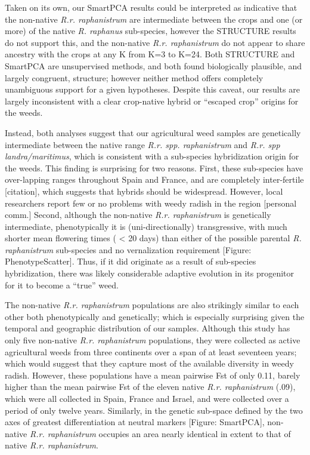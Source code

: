 \documentclass[twocolumn]{bmcart}%
\begin{document}
Taken on its own, our SmartPCA results could be interpreted as indicative that the non-native \textit{R.r. raphanistrum} are intermediate between the crops and one (or more) of the native \textit{R. raphanus} sub-species, however the STRUCTURE results do not support this, and the non-native \textit{R.r. raphanistrum} do not appear to share ancestry with the crops at any K from K=3 to K=24. Both STRUCTURE and SmartPCA are unsupervised methods, and both found biologically plausible, and largely congruent, structure; however neither method offers completely unambiguous support for a given hypotheses. Despite this caveat, our results are largely inconsistent with a clear crop-native hybrid or “escaped crop” origins for the weeds.

Instead, both analyses suggest that our agricultural weed samples are genetically intermediate between the native range \textit{R.r. spp. raphanistrum} and \textit{R.r. spp landra/maritimus}, which is consistent with a sub-species hybridization origin for the weeds. This finding is surprising for two reasons. First, these sub-species have over-lapping ranges throughout Spain and France, and are completely inter-fertile [citation], which suggests that hybrids should be widespread. However, local researchers report few or no problems with weedy radish in the region [personal comm.] Second, although the non-native \textit{R.r. raphanistrum} is genetically intermediate, phenotypically it is (uni-directionally) transgressive, with much shorter mean flowering times ( < 20 days) than either of the possible parental \textit{R. raphanistrum} sub-species and no vernalization requirement [Figure: PhenotypeScatter]. Thus, if it did originate as a result of sub-species hybridization, there was likely considerable adaptive evolution in its progenitor for it to become a “true” weed.
%
%
%

The non-native \textit{R.r. raphanistrum} populations are also strikingly similar to each other both phenotypically and genetically; which is especially surprising given the temporal and geographic distribution of our samples. Although this study has only five non-native \textit{R.r. raphanistrum} populations, they were collected as active agricultural weeds from three continents over a span of at least seventeen years; which would suggest that they capture most of the available diversity in weedy radish. However, these populations have a mean pairwise Fst of only 0.11, barely higher than the mean pairwise Fst of the eleven native \textit{R.r. raphanistrum} (.09), which were all collected in Spain, France and Israel, and were collected over a period of only twelve years. Similarly, in the genetic sub-space defined by the two axes of greatest differentiation at neutral markers [Figure: SmartPCA], non-native \textit{R.r. raphanistrum} occupies an area nearly identical in extent to that of native \textit{R.r. raphanistrum}. 
\end{document}
